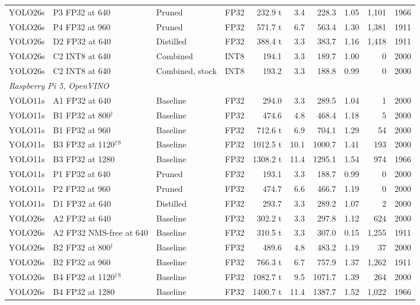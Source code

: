 \begin{longtable}{llllrrrrrr}
YOLO26s & P3 FP32 at 640 & Pruned & FP32 & 232.9 t & 3.4 & 228.3 & 1.05 & 1{,}101 & 1966 \\
YOLO26s & P4 FP32 at 960 & Pruned & FP32 & 571.7 t & 6.7 & 563.4 & 1.30 & 1{,}381 & 1911 \\
YOLO26s & D2 FP32 at 640 & Distilled & FP32 & 388.4 t & 3.3 & 383.7 & 1.16 & 1{,}418 & 1911 \\
YOLO26s & C2 INT8 at 640 & Combined & INT8 & 194.1 & 3.3 & 189.7 & 1.00 & 0 & 2000 \\
YOLO26s & C2 INT8 at 640 & Combined, stock & INT8 & 193.2 & 3.3 & 188.8 & 0.99 & 0 & 2000 \\
\midrule
\multicolumn{10}{l}{\textit{Raspberry Pi 5, OpenVINO}} \\
YOLO11s & A1 FP32 at 640 & Baseline & FP32 & 294.0 & 3.3 & 289.5 & 1.04 & 1 & 2000 \\
YOLO11s & B1 FP32 at 800$^{\dagger}$ & Baseline & FP32 & 474.6 & 4.8 & 468.4 & 1.18 & 5 & 2000 \\
YOLO11s & B1 FP32 at 960 & Baseline & FP32 & 712.6 t & 6.9 & 704.1 & 1.29 & 54 & 2000 \\
YOLO11s & B3 FP32 at 1120$^{\dagger}$$^{\mathrm{S}}$ & Baseline & FP32 & 1012.5 t & 10.1 & 1000.7 & 1.41 & 193 & 2000 \\
YOLO11s & B3 FP32 at 1280 & Baseline & FP32 & 1308.2 t & 11.4 & 1295.1 & 1.54 & 974 & 1966 \\
YOLO11s & P1 FP32 at 640 & Pruned & FP32 & 193.1 & 3.3 & 188.7 & 0.99 & 0 & 2000 \\
YOLO11s & P2 FP32 at 960 & Pruned & FP32 & 474.7 & 6.6 & 466.7 & 1.19 & 0 & 2000 \\
YOLO11s & D1 FP32 at 640 & Distilled & FP32 & 293.7 & 3.3 & 289.2 & 1.07 & 2 & 2000 \\
YOLO26s & A2 FP32 at 640 & Baseline & FP32 & 302.2 t & 3.3 & 297.8 & 1.12 & 624 & 2000 \\
YOLO26s & A2 FP32 NMS-free at 640 & Baseline & FP32 & 310.5 t & 3.3 & 307.0 & 0.15 & 1{,}255 & 1911 \\
YOLO26s & B2 FP32 at 800$^{\dagger}$ & Baseline & FP32 & 489.6 & 4.8 & 483.2 & 1.19 & 37 & 2000 \\
YOLO26s & B2 FP32 at 960 & Baseline & FP32 & 766.3 t & 6.7 & 757.9 & 1.37 & 1{,}262 & 1911 \\
YOLO26s & B4 FP32 at 1120$^{\dagger}$$^{\mathrm{S}}$ & Baseline & FP32 & 1082.7 t & 9.5 & 1071.7 & 1.39 & 264 & 2000 \\
YOLO26s & B4 FP32 at 1280 & Baseline & FP32 & 1400.7 t & 11.4 & 1387.7 & 1.52 & 1{,}022 & 1966 \\

\end{longtable}
